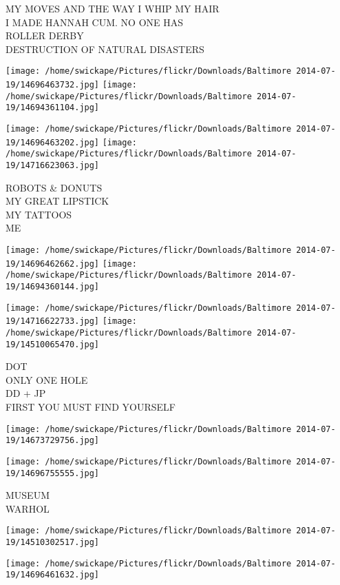 \documentclass[10pt,letterpaper]{article}
\begin{document}
MY MOVES AND THE WAY I WHIP MY HAIR\\
I MADE HANNAH CUM.  NO ONE HAS\\
ROLLER DERBY\\
DESTRUCTION OF NATURAL DISASTERS
\pagebreak

\texttt{[image: /home/swickape/Pictures/flickr/Downloads/Baltimore 2014-07-19/14696463732.jpg]}
\texttt{[image: /home/swickape/Pictures/flickr/Downloads/Baltimore 2014-07-19/14694361104.jpg]}

\texttt{[image: /home/swickape/Pictures/flickr/Downloads/Baltimore 2014-07-19/14696463202.jpg]}
\texttt{[image: /home/swickape/Pictures/flickr/Downloads/Baltimore 2014-07-19/14716623063.jpg]}

ROBOTS \& DONUTS\\
MY GREAT LIPSTICK\\
MY TATTOOS\\
ME
\pagebreak

\texttt{[image: /home/swickape/Pictures/flickr/Downloads/Baltimore 2014-07-19/14696462662.jpg]}
\texttt{[image: /home/swickape/Pictures/flickr/Downloads/Baltimore 2014-07-19/14694360144.jpg]}

\texttt{[image: /home/swickape/Pictures/flickr/Downloads/Baltimore 2014-07-19/14716622733.jpg]}
\texttt{[image: /home/swickape/Pictures/flickr/Downloads/Baltimore 2014-07-19/14510065470.jpg]}

DOT\\
ONLY ONE HOLE\\
DD + JP\\
FIRST YOU MUST FIND YOURSELF
\pagebreak

\texttt{[image: /home/swickape/Pictures/flickr/Downloads/Baltimore 2014-07-19/14673729756.jpg]}

\vspace{0.25in}
\texttt{[image: /home/swickape/Pictures/flickr/Downloads/Baltimore 2014-07-19/14696755555.jpg]}

MUSEUM\\
WARHOL
\pagebreak

\texttt{[image: /home/swickape/Pictures/flickr/Downloads/Baltimore 2014-07-19/14510302517.jpg]}

\vspace{0.25in}
\texttt{[image: /home/swickape/Pictures/flickr/Downloads/Baltimore 2014-07-19/14696461632.jpg]}
\end{document}
